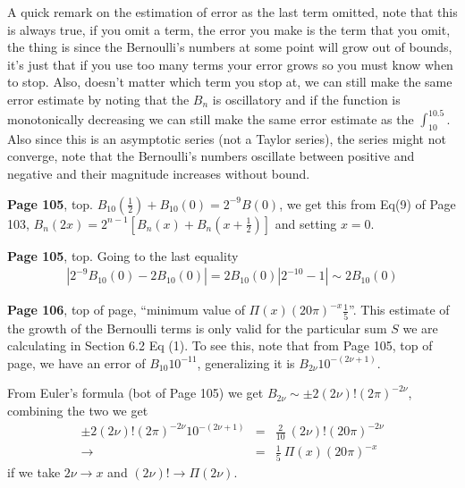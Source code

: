 \documentclass[aps,preprint,preprintnumbers,nofootinbib,showpacs,prd]{revtex4-1}
\newcommand{\nbea}{\begin{eqnarray*}}
\newcommand{\neea}{\end{eqnarray*}}
\begin{document}
%
A quick remark on the estimation of error as the last term omitted, note that this is always true, if you omit a term, the error you make is the term that you omit, the thing is since the Bernoulli's numbers at some point will grow out of bounds, it's just that if you use too many terms your error grows so you must know when to stop. Also, doesn't matter which term you stop at, we can still make the same error estimate by noting that the $B_n$ is oscillatory and if the function is monotonically decreasing we can still make the same error estimate as the $\int_{10}^{10.5}$. Also since this is an asymptotic series (not a Taylor series), the series might not converge, note that the Bernoulli's numbers oscillate between positive and negative and their magnitude increases without bound.

{\bf Page 105}, top. $B_{10}(\tfrac{1}{2}) + B_{10}(0) = 2^{-9}B(0)$, we get this from Eq(9) of Page 103, $B_n(2x) = 2^{n-1}[B_n(x) + B_n(x + \tfrac{1}{2})]$ and setting $x = 0$.

{\bf Page 105}, top. Going to the last equality
%
\nbea
|2^{-9} B_{10}(0) - 2B_{10}(0)| = 2B_{10}(0) |2^{-10} - 1| \sim 2B_{10}(0)
\neea
%

{\bf Page 106}, top of page, ``minimum value of $\Pi(x)(20\pi)^{-x} \frac{1}{5}$''. This estimate of the growth of the Bernoulli terms is only valid for the particular sum $S$ we are calculating in Section 6.2 Eq (1). To see this, note that from Page 105, top of page, we have an error of $B_{10} 10^{-11}$, generalizing it is $B_{2\nu} 10^{-(2\nu+1)}$.

From Euler's formula (bot of Page 105) we get $B_{2\nu} \sim \pm 2 (2\nu)! (2\pi)^{-2\nu}$, combining the two we get
%
\nbea
\pm 2 (2\nu)! (2\pi)^{-2\nu} 10^{-(2\nu+1)} & = & \frac{2}{10}~ (2\nu)! (20\pi)^{-2\nu} \\
\to & = & \frac{1}{5}~ \Pi(x)  (20\pi)^{-x}
\neea
%
if we take $2\nu \to x$ and $(2\nu)! \to \Pi(2\nu)$.
\end{document}
